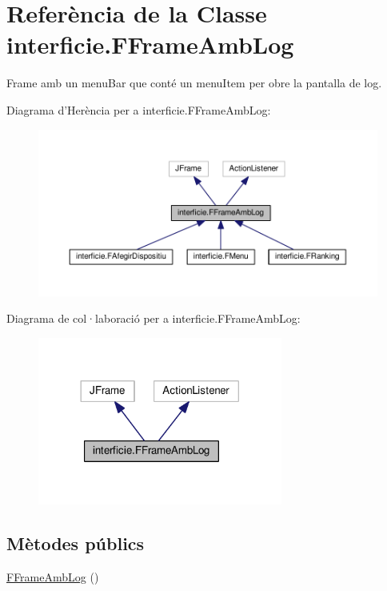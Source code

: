 \hypertarget{classinterficie_1_1_f_frame_amb_log}{\section{Referència de la Classe interficie.\+F\+Frame\+Amb\+Log}
\label{classinterficie_1_1_f_frame_amb_log}
}


Frame amb un menu\+Bar que conté un menu\+Item per obre la pantalla de log.  




Diagrama d'Herència per a interficie.\+F\+Frame\+Amb\+Log\+:\nopagebreak
\begin{figure}[H]
\begin{center}
\leavevmode
\includegraphics[width=350pt]{classinterficie_1_1_f_frame_amb_log__inherit__graph}
\end{center}
\end{figure}


Diagrama de col·laboració per a interficie.\+F\+Frame\+Amb\+Log\+:\nopagebreak
\begin{figure}[H]
\begin{center}
\leavevmode
\includegraphics[width=228pt]{classinterficie_1_1_f_frame_amb_log__coll__graph}
\end{center}
\end{figure}
\subsection*{Mètodes públics}
\begin{DoxyCompactItemize}
\item 
\hyperlink{classinterficie_1_1_f_frame_amb_log_aa939f89f061621a1368f7076aa14f8df}{F\+Frame\+Amb\+Log} ()
\end{DoxyCompactItemize}


